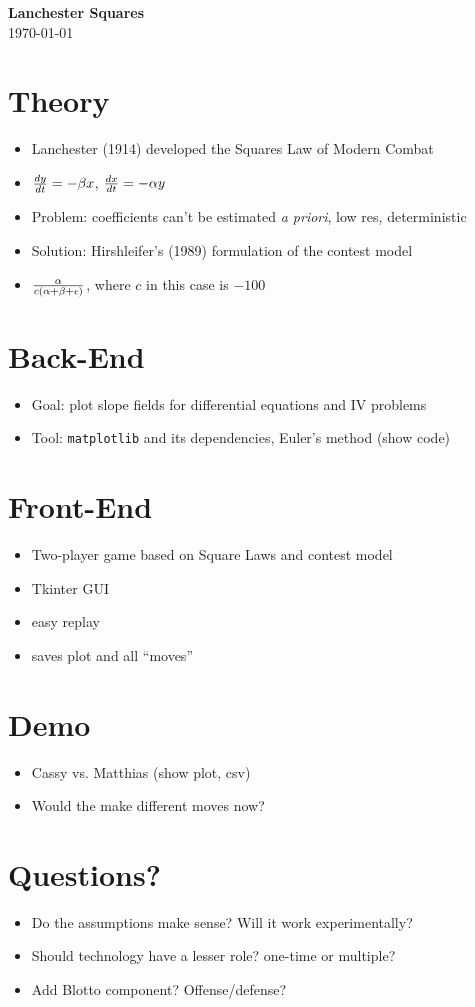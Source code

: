 \documentclass[12pt,letter]{article}
\newcommand{\compresslist}{%
\setlength{\itemsep}{1pt}%
\setlength{\parskip}{0pt}%
\setlength{\parsep}{0pt}%
}
\begin{document}
\begin{center}
\Huge{\textbf{Lanchester Squares}} \\
\normalsize \today \\
\end{center}
\onehalfspacing
\section{Theory}
\begin{itemize}\compresslist
\item Lanchester (1914) developed
  the Squares Law of Modern Combat 
\item $ {dy \over dt} = -\beta x$, ${dx \over dt} = -\alpha y$
\item Problem: coefficients can't be estimated \emph{a priori}, low
  res, deterministic
\item Solution: Hirshleifer's (1989) formulation of the contest model
\item $\alpha \over {c(\alpha+\beta +\epsilon)}$, where $c$ in this case is $-100$
\end{itemize}

\section{Back-End}
\begin{itemize}\compresslist
\item Goal: plot slope fields for differential equations and IV problems
\item Tool: \texttt{matplotlib} and its dependencies, Euler's method (show code)
\end{itemize}

\section{Front-End}
\begin{itemize}\compresslist
\item Two-player game based on Square Laws and contest model
\item Tkinter GUI
\item easy replay
\item saves plot and all ``moves''
\end{itemize}

\section{Demo}
\begin{itemize}\compresslist
\item Cassy vs. Matthias (show plot, csv)
\item Would the make different moves now? 
\end{itemize}

\section{Questions?}
\begin{itemize}\compresslist
\item Do the assumptions make sense? Will it work experimentally?
\item Should technology have a lesser role? one-time or multiple?
\item Add Blotto component? Offense/defense?
\end{itemize}
\end{document}
